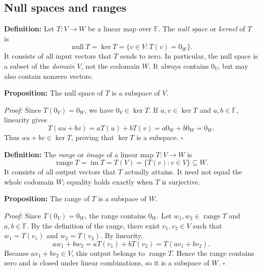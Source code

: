 \documentclass[a4paper,11pt,abstract=true]{scrartcl}
\theoremstyle{dotlessP}
\theoremstyle{dotlessS}
\theoremstyle{remark}
\theoremstyle{definition}
\begin{document}
\subsection{Null spaces and ranges}

\begin{definition_box}
\textbf{Definition:} Let
$T:V\longrightarrow W$ be a linear map over $\mathbb{F}$. The
\emph{null space} or \emph{kernel} of $T$ is
\[
\operatorname{null}T=\ker T=\{v\in V:T(v)=0_W\}.
\]
It consists of all input vectors that $T$ sends to zero. In particular,
the null space is a subset of the \emph{domain} $V$, not the codomain $W$.
It always contains $0_V$, but may also contain nonzero vectors.
\end{definition_box}

\begin{problem_box}
\textbf{Proposition:} The null space of $T$ is a subspace of $V$.

\end{problem_box}

\begin{claim_box}
\textit{Proof:} Since $T(0_V)=0_W$, we have $0_V\in\ker T$.
If $u,v\in\ker T$ and $a,b\in\mathbb{F}$, linearity gives
\[
T(au+bv)=aT(u)+bT(v)=a0_W+b0_W=0_W.
\]
Thus $au+bv\in\ker T$, proving that $\ker T$ is a subspace.
\hfill$\square$
\end{claim_box}

\begin{definition_box}
\textbf{Definition:} The \emph{range} or
\emph{image} of a linear map $T:V\longrightarrow W$ is
\[
\operatorname{range}T=\operatorname{im}T=T(V)
=\{T(v):v\in V\}\subseteq W.
\]
It consists of all output vectors that $T$ actually attains. It need not
equal the whole codomain $W$; equality holds exactly when $T$ is surjective.
\end{definition_box}

\begin{problem_box}
\textbf{Proposition:} The range of $T$ is a subspace of $W$.

\end{problem_box}

\begin{claim_box}
\textit{Proof:} Since $T(0_V)=0_W$, the range contains $0_W$.
Let $w_1,w_2\in\operatorname{range}T$ and $a,b\in\mathbb{F}$.
By the definition of the range, there exist $v_1,v_2\in V$ such that
$w_1=T(v_1)$ and $w_2=T(v_2)$. By linearity,
\[
aw_1+bw_2=aT(v_1)+bT(v_2)=T(av_1+bv_2).
\]
Because $av_1+bv_2\in V$, this output belongs to
$\operatorname{range}T$. Hence the range contains zero and is closed under
linear combinations, so it is a subspace of $W$. \hfill$\square$
\end{claim_box}
\end{document}
